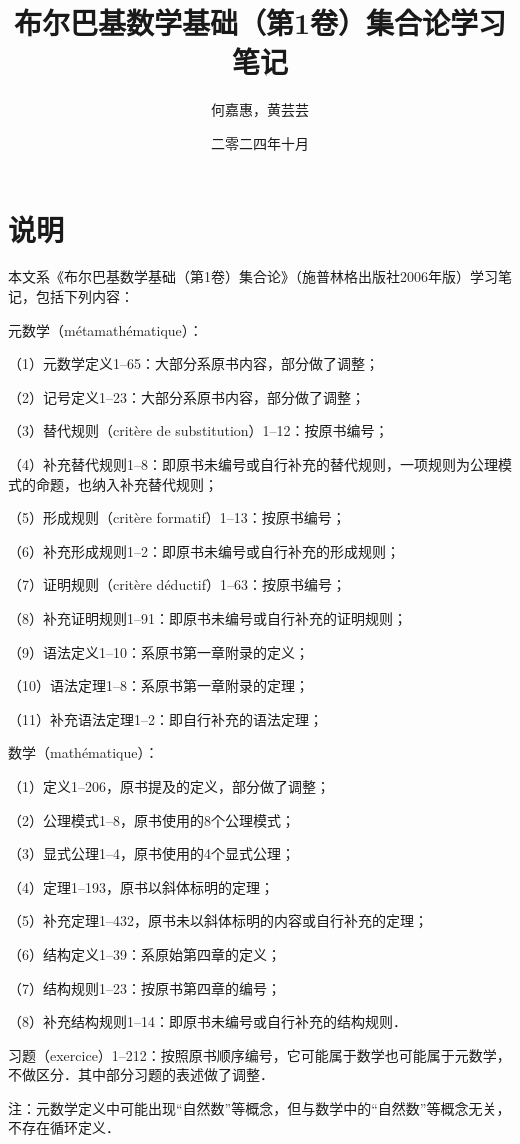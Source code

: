 \documentclass[12pt, a4paper, oneside]{book}
\title{布尔巴基数学基础（第1卷）集合论学习笔记}
\author{何嘉惠，黄芸芸}
\date{二零二四年十月}
\begin{document}
	\pagestyle{plain}
	\frontmatter
	\hypersetup{pageanchor=false}
	\maketitle
	\hypersetup{pageanchor=true}

	\chapter{说明}
		本文系《布尔巴基数学基础（第1卷）集合论》（施普林格出版社2006年版）学习笔记，包括下列内容：
		\par
		元数学（métamathématique）：
		\par
		（1）元数学定义1--65：大部分系原书内容，部分做了调整；
		\par
		（2）记号定义1--23：大部分系原书内容，部分做了调整；
		\par
		（3）替代规则（critère de substitution）1--12：按原书编号；
		\par
		（4）补充替代规则1--8：即原书未编号或自行补充的替代规则，一项规则为公理模式的命题，也纳入补充替代规则；
		\par
		（5）形成规则（critère formatif）1--13：按原书编号；
		\par
		（6）补充形成规则1--2：即原书未编号或自行补充的形成规则；
		\par
		（7）证明规则（critère déductif）1--63：按原书编号；
		\par
		（8）补充证明规则1--91：即原书未编号或自行补充的证明规则；
		\par
		（9）语法定义1--10：系原书第一章附录的定义；
		\par
		（10）语法定理1--8：系原书第一章附录的定理；
		\par
		（11）补充语法定理1--2：即自行补充的语法定理；
		\par
		数学（mathématique）：
		\par
		（1）定义1--206，原书提及的定义，部分做了调整；
		\par
		（2）公理模式1--8，原书使用的8个公理模式；
		\par
		（3）显式公理1--4，原书使用的4个显式公理；
		\par
		（4）定理1--193，原书以斜体标明的定理；
		\par
		（5）补充定理1--432，原书未以斜体标明的内容或自行补充的定理；
		\par
		（6）结构定义1--39：系原始第四章的定义；
		\par
		（7）结构规则1--23：按原书第四章的编号；
		\par
		（8）补充结构规则1--14：即原书未编号或自行补充的结构规则．
		\par
		习题（exercice）1--212：按照原书顺序编号，它可能属于数学也可能属于元数学，不做区分．其中部分习题的表述做了调整．
		\par
		注：元数学定义中可能出现“自然数”等概念，但与数学中的“自然数”等概念无关，不存在循环定义．
\end{document}
